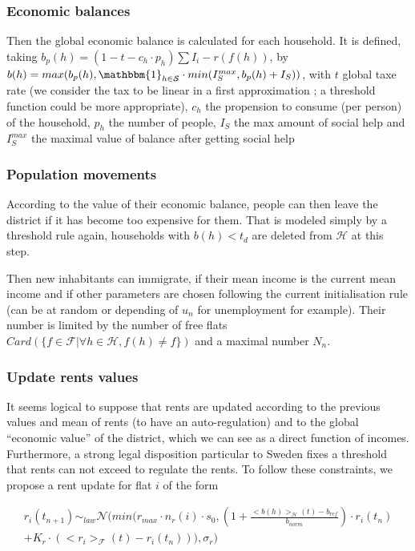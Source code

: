\documentclass[english]{article}
\begin{document}
\subsubsection{Economic balances}

Then the global economic balance is calculated for each household.
It is defined, taking $b_{p}(h)=(1-t-c_{h}\cdot p_{h})\sum I_{i}-r(f(h))$,
by $b(h)=max(b_{p}(h),\mathbbm{1}_{h\in \mathcal{S}} \cdot min(I_{S}^{max},b_{p}(h)+I_{S}))$,
with $t$ global taxe rate (we consider the tax to be linear in a first approximation
; a threshold function could be more appropriate), $c_{h}$ the propension
to consume (per person) of the household, $p_{h}$ the number of people,
$I_{S}$ the max amount of social help and $I_{S}^{max}$ the maximal
value of balance after getting social help


\subsubsection{Population movements}

According to the value of their economic balance, people can then
leave the district if it has become too expensive for them. That is
modeled simply by a threshold rule again, households with $b(h)<t_{d}$
are deleted from $\mathcal{H}$ at this step.

Then new inhabitants can immigrate, if their mean income is the current mean
income and if other parameters are chosen following the current initialisation
rule (can be at random or depending of $u_{n}$ for unemployment for
example). Their number is limited by the number of free flats $Card(\{f\in\mathcal{F}|\forall h\in\mathcal{H},f(h)\neq f\})$
and a maximal number $N_{n}$.


\subsubsection{Update rents values}

It seems logical to suppose that rents are updated according to the
previous values and mean of rents (to have an auto-regulation) and
to the global ``economic value'' of the district, which we can see
as a direct function of incomes. Furthermore, a strong legal disposition
particular to Sweden fixes a threshold that rents can not exceed to
regulate the rents. To follow these constraints, we propose a rent
update for flat $i$ of the form

\[
\begin{array}{c}
r_{i}(t_{n+1})\sim_{law}\mathcal{N}(min(r_{max}\cdot n_{r}(i)\cdot s_{0},(1+\frac{<b(h)>_{\mathcal{H}}(t)-b_{ref}}{b_{norm}})\cdot r_{i}(t_{n})\\
+K_{r}\cdot(<r_{i}>_{\mathcal{F}}(t)-r_{i}(t_{n}))),\sigma_{r})
\end{array}
\]
\end{document}
